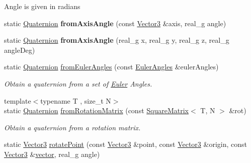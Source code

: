 Angle is given in radians \begin{DoxyCompactItemize}
\item 
\mbox{\label{classrev_1_1_quaternion_a9784d1cc19eca6fc5e543d6e843ba73a}} 
static \mbox{\hyperlink{classrev_1_1_quaternion}{Quaternion}} {\bfseries from\+Axis\+Angle} (const \mbox{\hyperlink{classrev_1_1_vector}{Vector3}} \&axis, real\+\_\+g angle)
\item 
\mbox{\label{classrev_1_1_quaternion_a953185164add98ff419af2d0f62956fe}} 
static \mbox{\hyperlink{classrev_1_1_quaternion}{Quaternion}} {\bfseries from\+Axis\+Angle} (real\+\_\+g x, real\+\_\+g y, real\+\_\+g z, real\+\_\+g angle\+Deg)
\item 
static \mbox{\hyperlink{classrev_1_1_quaternion}{Quaternion}} \mbox{\hyperlink{classrev_1_1_quaternion_a50c2a07546cc78657d87459c4e6c34fd}{from\+Euler\+Angles}} (const \mbox{\hyperlink{classrev_1_1_euler_angles}{Euler\+Angles}} \&euler\+Angles)
\begin{DoxyCompactList}\small\item\em Obtain a quaternion from a set of \mbox{\hyperlink{class_euler}{Euler}} Angles. \end{DoxyCompactList}\item 
\mbox{\label{classrev_1_1_quaternion_a39a9e73f1a705b5d2c313db822fe53bc}} 
{\footnotesize template$<$typename T , size\+\_\+t N$>$ }\\static \mbox{\hyperlink{classrev_1_1_quaternion}{Quaternion}} \mbox{\hyperlink{classrev_1_1_quaternion_a39a9e73f1a705b5d2c313db822fe53bc}{from\+Rotation\+Matrix}} (const \mbox{\hyperlink{classrev_1_1_square_matrix}{Square\+Matrix}}$<$ T, N $>$ \&rot)
\begin{DoxyCompactList}\small\item\em Obtain a quaternion from a rotation matrix. \end{DoxyCompactList}\item 
\mbox{\label{classrev_1_1_quaternion_a4cff4e9d2e1a70d717965a840e0dd14d}} 
static \mbox{\hyperlink{classrev_1_1_vector}{Vector3}} \mbox{\hyperlink{classrev_1_1_quaternion_a4cff4e9d2e1a70d717965a840e0dd14d}{rotate\+Point}} (const \mbox{\hyperlink{classrev_1_1_vector}{Vector3}} \&point, const \mbox{\hyperlink{classrev_1_1_vector}{Vector3}} \&origin, const \mbox{\hyperlink{classrev_1_1_vector}{Vector3}} \&\mbox{\hyperlink{classrev_1_1_quaternion_a73919230823ebf8a8c8b9603a10c8dcc}{vector}}, real\+\_\+g angle)

\end{DoxyCompactItemize}
